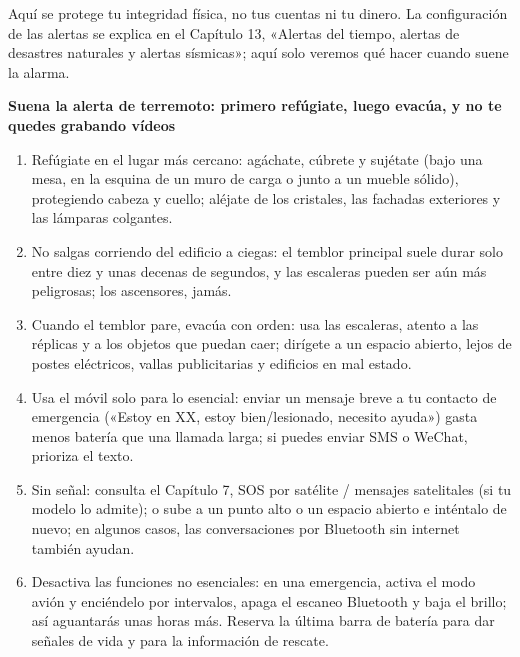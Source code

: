 


Aquí se protege tu integridad física, no tus cuentas ni tu dinero. La configuración de las alertas se explica en el Capítulo 13, «Alertas del tiempo, alertas de desastres naturales y alertas sísmicas»; aquí solo veremos qué hacer cuando suene la alarma.

\textbf{Suena la alerta de terremoto: primero refúgiate, luego evacúa, y no te quedes grabando vídeos}\par

\begin{enumerate}
  \item Refúgiate en el lugar más cercano: agáchate, cúbrete y sujétate (bajo una mesa, en la esquina de un muro de carga o junto a un mueble sólido), protegiendo cabeza y cuello; aléjate de los cristales, las fachadas exteriores y las lámparas colgantes.
  \item No salgas corriendo del edificio a ciegas: el temblor principal suele durar solo entre diez y unas decenas de segundos, y las escaleras pueden ser aún más peligrosas; los ascensores, jamás.
  \item Cuando el temblor pare, evacúa con orden: usa las escaleras, atento a las réplicas y a los objetos que puedan caer; dirígete a un espacio abierto, lejos de postes eléctricos, vallas publicitarias y edificios en mal estado.
  \item Usa el móvil solo para lo esencial: enviar un mensaje breve a tu contacto de emergencia («Estoy en XX, estoy bien/lesionado, necesito ayuda») gasta menos batería que una llamada larga; si puedes enviar SMS o WeChat, prioriza el texto.
  \item Sin señal: consulta el Capítulo 7, SOS por satélite / mensajes satelitales (si tu modelo lo admite); o sube a un punto alto o un espacio abierto e inténtalo de nuevo; en algunos casos, las conversaciones por Bluetooth sin internet también ayudan.
  \item Desactiva las funciones no esenciales: en una emergencia, activa el modo avión y enciéndelo por intervalos, apaga el escaneo Bluetooth y baja el brillo; así aguantarás unas horas más. Reserva la última barra de batería para dar señales de vida y para la información de rescate.
\end{enumerate}

